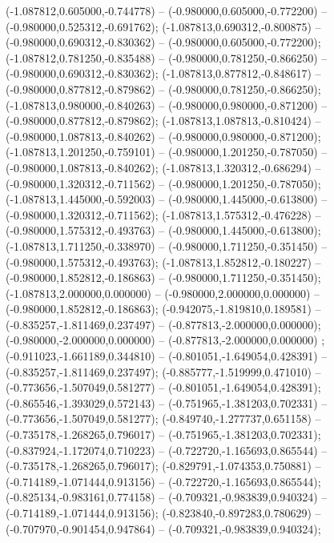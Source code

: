  (-1.087812,0.605000,-0.744778) -- (-0.980000,0.605000,-0.772200) -- (-0.980000,0.525312,-0.691762);
 (-1.087813,0.690312,-0.800875) -- (-0.980000,0.690312,-0.830362) -- (-0.980000,0.605000,-0.772200);
 (-1.087812,0.781250,-0.835488) -- (-0.980000,0.781250,-0.866250) -- (-0.980000,0.690312,-0.830362);
 (-1.087813,0.877812,-0.848617) -- (-0.980000,0.877812,-0.879862) -- (-0.980000,0.781250,-0.866250);
 (-1.087813,0.980000,-0.840263) -- (-0.980000,0.980000,-0.871200) -- (-0.980000,0.877812,-0.879862);
 (-1.087813,1.087813,-0.810424) -- (-0.980000,1.087813,-0.840262) -- (-0.980000,0.980000,-0.871200);
 (-1.087813,1.201250,-0.759101) -- (-0.980000,1.201250,-0.787050) -- (-0.980000,1.087813,-0.840262);
 (-1.087813,1.320312,-0.686294) -- (-0.980000,1.320312,-0.711562) -- (-0.980000,1.201250,-0.787050);
 (-1.087813,1.445000,-0.592003) -- (-0.980000,1.445000,-0.613800) -- (-0.980000,1.320312,-0.711562);
 (-1.087813,1.575312,-0.476228) -- (-0.980000,1.575312,-0.493763) -- (-0.980000,1.445000,-0.613800);
 (-1.087813,1.711250,-0.338970) -- (-0.980000,1.711250,-0.351450) -- (-0.980000,1.575312,-0.493763);
 (-1.087813,1.852812,-0.180227) -- (-0.980000,1.852812,-0.186863) -- (-0.980000,1.711250,-0.351450);
 (-1.087813,2.000000,0.000000) -- (-0.980000,2.000000,0.000000) -- (-0.980000,1.852812,-0.186863);
 (-0.942075,-1.819810,0.189581) -- (-0.835257,-1.811469,0.237497) -- (-0.877813,-2.000000,0.000000);
 (-0.980000,-2.000000,0.000000) -- (-0.877813,-2.000000,0.000000) ;
 (-0.911023,-1.661189,0.344810) -- (-0.801051,-1.649054,0.428391) -- (-0.835257,-1.811469,0.237497);
 (-0.885777,-1.519999,0.471010) -- (-0.773656,-1.507049,0.581277) -- (-0.801051,-1.649054,0.428391);
 (-0.865546,-1.393029,0.572143) -- (-0.751965,-1.381203,0.702331) -- (-0.773656,-1.507049,0.581277);
 (-0.849740,-1.277737,0.651158) -- (-0.735178,-1.268265,0.796017) -- (-0.751965,-1.381203,0.702331);
 (-0.837924,-1.172074,0.710223) -- (-0.722720,-1.165693,0.865544) -- (-0.735178,-1.268265,0.796017);
 (-0.829791,-1.074353,0.750881) -- (-0.714189,-1.071444,0.913156) -- (-0.722720,-1.165693,0.865544);
 (-0.825134,-0.983161,0.774158) -- (-0.709321,-0.983839,0.940324) -- (-0.714189,-1.071444,0.913156);
 (-0.823840,-0.897283,0.780629) -- (-0.707970,-0.901454,0.947864) -- (-0.709321,-0.983839,0.940324);
